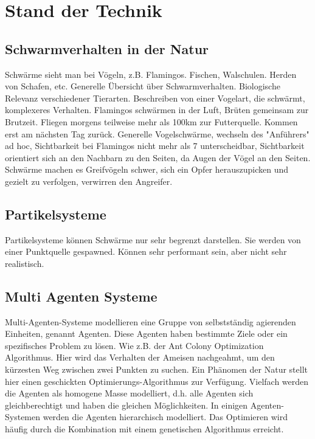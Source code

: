 \documentclass[draft=false
              ,paper=a4
              ,twoside=false
              ,fontsize=11pt
              ,headsepline
              ,BCOR10mm
              ,DIV11
              ,bibtotoc
              ,liststotoc
              ]{scrbook}
\begin{document}
\chapter{Stand der Technik}\label{stand}
\section{Schwarmverhalten in der Natur}
Schwärme sieht man bei Vögeln, z.B. Flamingos. Fischen, Walschulen. Herden von Schafen, etc. Generelle Übersicht über Schwarmverhalten. Biologische Relevanz verschiedener Tierarten. Beschreiben von einer Vogelart, die schwärmt, komplexeres Verhalten. Flamingos schwärmen in der Luft, Brüten gemeinsam zur Brutzeit. Fliegen morgens teilweise mehr als 100km zur Futterquelle. Kommen erst am nächsten Tag zurück.
Generelle Vogelschwärme, wechseln des "Anführers" ad hoc, Sichtbarkeit bei Flamingos nicht mehr als 7 unterscheidbar, Sichtbarkeit orientiert sich an den Nachbarn zu den Seiten, da Augen der Vögel an den Seiten. 
Schwärme machen es Greifvögeln schwer, sich ein Opfer herauszupicken und gezielt zu verfolgen, verwirren den Angreifer. 
\section{Partikelsysteme}
Partikelsysteme können Schwärme nur sehr begrenzt darstellen. Sie werden von einer Punktquelle gespawned. Können sehr performant sein, aber nicht sehr realistisch.
\section{Multi Agenten Systeme}
Multi-Agenten-Systeme modellieren eine Gruppe von selbstständig agierenden Einheiten, genannt Agenten. Diese Agenten haben bestimmte Ziele oder ein spezifisches Problem zu lösen. Wie z.B. der Ant Colony Optimization Algorithmus. Hier wird das Verhalten der Ameisen nachgeahmt, um den kürzesten Weg zwischen zwei Punkten zu suchen. Ein Phänomen der Natur stellt hier einen geschickten Optimierungs-Algorithmus zur Verfügung. 
Vielfach werden die Agenten als homogene Masse modelliert, d.h. alle Agenten sich gleichberechtigt und haben die gleichen Möglichkeiten. In einigen Agenten-Systemen werden die Agenten hierarchisch modelliert. Das Optimieren wird häufig durch die Kombination mit einem genetischen Algorithmus erreicht. 
\end{document}
